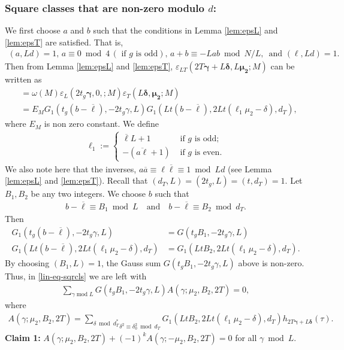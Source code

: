 \documentclass[11pt]{amsart}
\numberwithin{equation}{section}
\renewcommand*{\mod}{\operatorname{mod}}
\newcommand{\q}{\quad}
\begin{document}
\subsubsection{Square classes that are non-zero modulo $d$:}\label{sec:non-zerosqrcls}
We first choose $a$ and $b$ such that the conditions in Lemma \ref{lem:epsL} and \ref{lem:epsT} are satisfied. That is,
\begin{align}
(a, Ld)=1,\, a\equiv 0\bmod 4 \,(\text{ if } g \text{ is odd}),\, a+b\equiv -Lab\bmod N/L,\, \text{ and } (\ell, Ld)=1.   
\end{align}
Then from  Lemma \ref{lem:epsL} and \ref{lem:epsT},  $\varepsilon_{LT}(2T{\bm{ \gamma}}+L\bm\delta, L\bm{\mu_2};  M)$ can be written as
\begin{align}
&= \omega(M)\varepsilon_L(2t_g\bm\gamma, 0,; M)\varepsilon_T(L\bm\delta, \bm{\mu_2}; M)\\
&=  E_{M}G_1(t_g(b-\overline{\ell}), -2t_g\gamma, L)G_1(Lt(b-\overline{\ell}),2Lt (\ell_1\mu_2-\delta), d_T),
\end{align}
where $E_{M}$ is non zero constant. We define
\begin{align}
    \ell_1:=\begin{cases}
        \overline{\ell}L+1& \text { if } g \text{ is odd};\\
        -(\overline{a\ell}+1) & \text { if } g \text{ is even}.
    \end{cases}
\end{align}
We also note here that the inverses, $a\overline{a}\equiv \ell\overline{\ell}\equiv 1\bmod Ld$ (see Lemma \ref{lem:epsL} and \ref{lem:epsT}). Recall that $(d_T, L)=(2t_g, L)=(t, d_T)=1$. Let $B_1, B_2$ be any two integers.  We choose $b$ such that 
\begin{align}
b-\overline{\ell}\equiv B_1\bmod L \q\text{and}\q
b-\overline{\ell}\equiv B_2\bmod d_T.
\end{align}
Then
\begin{align} \label{modL}
G_1(t_g(b-\overline{\ell}),-2t_g \gamma, L)&= G(t_gB_1, -2t_g\gamma, L)\\
G_1(Lt(b-\overline{\ell}),2L t(\ell_1\mu_2-\delta), d_T)&=G_1(LtB_2, 2Lt (\ell_1\mu_2-\delta), d_T).\label{mod2M}
\end{align}
By choosing $(B_1, L)=1$, the Gauss sum $G(t_gB_1, -2t_g\gamma, L)$ above is non-zero. Thus, in \eqref{lin-eq-sqrcls} we are left with
\begin{align}\label{gammaA_gamma}
    \sum_{\gamma\mod L}G(t_gB_1, -2t_g\gamma, L)A(\gamma; \mu_2, B_2, 2T)=0,
\end{align}
where
\begin{align}
  A(\gamma; \mu_2, B_2, 2T)=  \underset{{\delta}^2\equiv {\delta}_{0}^2 \bmod d_T}{\sum_{\delta\bmod d_T^*}} G_1(LtB_2, 2Lt (\ell_1\mu_2-\delta), d_T) h_{2T{\bm{ \gamma}}+L\bm{\delta}}(\tau).
\end{align}
\textbf{Claim 1:} $A(\gamma; \mu_2, B_2, 2T)+(-1)^kA(\gamma; -\mu_2, B_2, 2T)=0$ for all $\gamma\bmod L$. 
\end{document}
